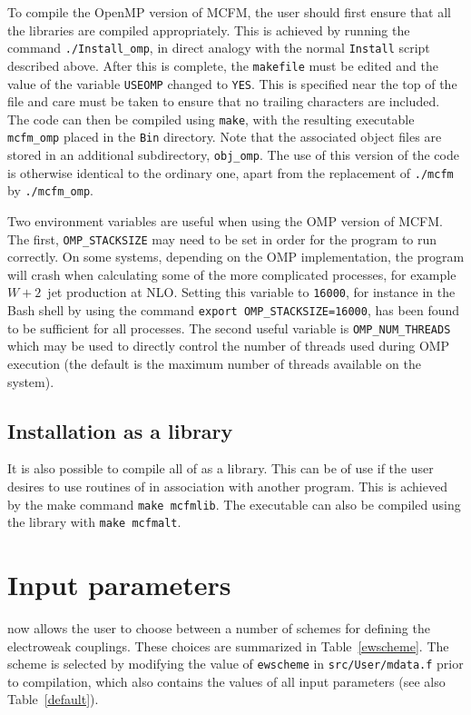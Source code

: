 \documentclass[12pt]{article}
\begin{document}
To compile the OpenMP version of MCFM, the user should first ensure
that all the libraries are compiled appropriately.  This is achieved
by running the command {\tt ./Install\_omp}, in direct analogy with the
normal {\tt Install} script described above.  After this is complete,
the {\tt makefile} must be edited and the value of the variable
{\tt USEOMP} changed to {\tt YES}.  This is specified near the top
of the file and care must be taken to ensure that no trailing characters
are included.  The code can then be compiled using {\tt make},
with the resulting executable {\tt mcfm\_omp} placed in the {\tt Bin}
directory.  Note that the associated object files are stored in an
additional subdirectory, {\tt obj\_omp}.  The use of this version
of the code is otherwise identical to the ordinary one, apart from
the replacement of {\tt ./mcfm} by {\tt ./mcfm\_omp}.

Two environment variables are useful when using the OMP version of MCFM.
The first, {\tt OMP\_STACKSIZE} may need to be set in order for the program
to run correctly.  On some systems, depending on the OMP implementation,
the program will crash when calculating some of the more complicated processes,
for example $W+2$~jet production at NLO.  Setting this
variable to {\tt 16000}, for instance in the Bash shell by using the
command {\tt export OMP\_STACKSIZE=16000}, has been found to be sufficient
for all processes.  The second useful variable is {\tt OMP\_NUM\_THREADS}
which may be used to directly control the number of threads used during
OMP execution (the default is the maximum number of threads available
on the system).

\subsection{Installation as a library}
It is also possible to compile all of \MCFM as a library.
This can be of use if the user desires to use routines of \MCFM 
in association with another program. This is achieved by the make command
{\tt make mcfmlib}.  The \MCFM executable can also be compiled using
the library with {\tt make mcfmalt}.
 
\section{Input parameters}
\label{Input_parameters}
\MCFM now allows the user to choose between a number of schemes
for defining the electroweak couplings. These choices are summarized
in Table~\ref{ewscheme}. The scheme is selected by modifying the
value of {\tt ewscheme} in {\tt src/User/mdata.f} prior to compilation, 
which also contains
the values of all input parameters (see also Table~\ref{default}).
\end{document}
